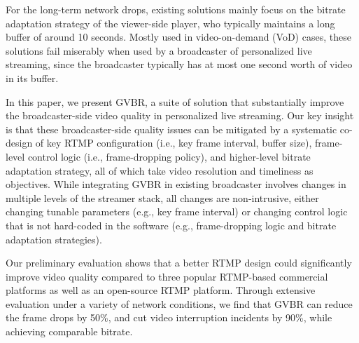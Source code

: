 For the long-term network drops, existing solutions mainly focus on the 
bitrate adaptation strategy of the viewer-side player, who typically maintains 
a long buffer of around 10 seconds. Mostly used in video-on-demand (VoD) cases,
these solutions fail miserably when used by a broadcaster of personalized live
streaming, since the broadcaster typically has at most one second worth of 
video in its buffer. 

In this paper, we present GVBR, a suite of solution that substantially improve
the broadcaster-side video quality in personalized live streaming.
Our key insight is that these broadcaster-side quality issues can be mitigated 
by a systematic co-design of key RTMP configuration (i.e., key frame
interval, buffer size), frame-level control logic (i.e., frame-dropping policy), 
and higher-level bitrate adaptation strategy, all of which take
video resolution and timeliness as objectives. 
While integrating GVBR in existing broadcaster involves changes in multiple
levels of the streamer stack, all changes are non-intrusive, either changing 
tunable parameters (e.g., key frame interval) or changing control logic that
is not hard-coded in the software (e.g., frame-dropping logic and bitrate 
adaptation strategies). 


Our preliminary evaluation shows that a better RTMP design
could significantly improve video quality compared to three popular
RTMP-based commercial  platforms as well as an open-source
RTMP platform.
Through extensive evaluation under a variety of network conditions, we find that 
GVBR can reduce the frame drops by 50\%, and cut video interruption incidents 
by 90\%, while achieving comparable bitrate.




